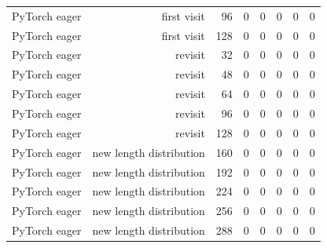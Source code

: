 \begin{tabular}{lrrrrrrr}
PyTorch eager & first visit & 96 & 0 & 0 & 0 & 0 & 0 \\
PyTorch eager & first visit & 128 & 0 & 0 & 0 & 0 & 0 \\
PyTorch eager & revisit & 32 & 0 & 0 & 0 & 0 & 0 \\
PyTorch eager & revisit & 48 & 0 & 0 & 0 & 0 & 0 \\
PyTorch eager & revisit & 64 & 0 & 0 & 0 & 0 & 0 \\
PyTorch eager & revisit & 96 & 0 & 0 & 0 & 0 & 0 \\
PyTorch eager & revisit & 128 & 0 & 0 & 0 & 0 & 0 \\
PyTorch eager & new length distribution & 160 & 0 & 0 & 0 & 0 & 0 \\
PyTorch eager & new length distribution & 192 & 0 & 0 & 0 & 0 & 0 \\
PyTorch eager & new length distribution & 224 & 0 & 0 & 0 & 0 & 0 \\
PyTorch eager & new length distribution & 256 & 0 & 0 & 0 & 0 & 0 \\
PyTorch eager & new length distribution & 288 & 0 & 0 & 0 & 0 & 0 \\
\bottomrule
\end{tabular}
